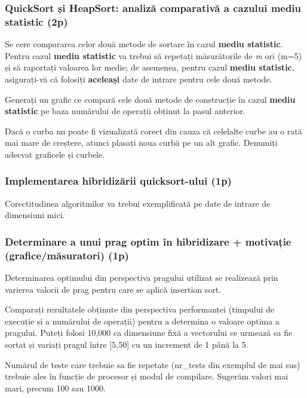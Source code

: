 \documentclass[../ro-fa-lab.tex]{subfiles}
\begin{document}
\subsubsection{QuickSort și HeapSort: analiză comparativă a cazului mediu
statistic
(2p)}\label{quicksort-ux219i-heapsort-analizux103-comparativux103-a-cazului-mediu-statistic-2p}

Se cere compararea celor două metode de sortare în cazul \textbf{mediu
statistic}. Pentru cazul \textbf{mediu statistic} va trebui să repetați
măsurătorile de \emph{m} ori (m=5) și să raportați valoarea lor medie;
de asemenea, pentru cazul \textbf{mediu statistic}, asigurați-vă că
folosiți \textbf{aceleași} date de intrare pentru cele două metode.

Generați un grafic ce compară cele două metode de construcție în cazul
\textbf{mediu statistic} pe baza numărului de operații obținut la pasul
anterior.

Dacă o curba nu poate fi vizualizată corect din cauza că celelalte curbe
au o rată mai mare de creștere, atunci plasați noua curbă pe un alt
grafic. Denumiți adecvat graficele și curbele.

\subsubsection{Implementarea hibridizării quicksort-ului
(1p)}\label{implementarea-hibridizux103rii-quicksort-ului-1p}

Corectitudinea algoritmilor va trebui exemplificată pe date de intrare
de dimensiuni mici.

\subsubsection{Determinare a unui prag optim în hibridizare + motivație
(grafice/măsuratori)
(1p)}\label{determinare-a-unui-prag-optim-uxeen-hibridizare-motivaux21bie-graficemux103suratori-1p}

Determinarea optimului din perspectiva pragului utilizat se realizează
prin varierea valorii de prag pentru care se aplică insertion sort.

Comparați rezultatele obținute din perspectiva performanței (timpului de
execuție și a numărului de operații) pentru a determina o valoare optima
a pragului. Puteți folosi 10,000 ca dimensiune fixă a vectorului ce
urmează sa fie sortat și variați pragul între {[}5,50{]} cu un increment
de 1 până la 5.

Numărul de teste care trebuie sa fie repetate (nr\_tests din exemplul de
mai sus) trebuie ales în funcție de procesor și modul de compilare.
Sugerăm valori mai mari, precum 100 sau 1000.
\end{document}
